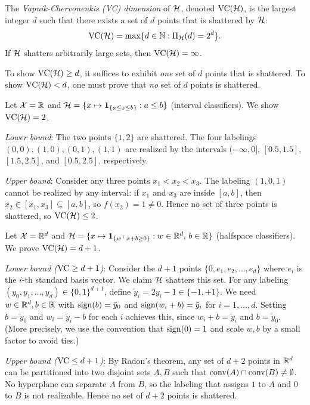 \documentclass[11pt,a4paper]{article}
\begin{document}
\begin{definition}[VC Dimension]
\label{def:vc_dim}
The \emph{Vapnik-Chervonenkis (VC) dimension} of $\mathcal{H}$, denoted
$\operatorname{VC}(\mathcal{H})$, is the largest integer $d$ such that there exists a
set of $d$ points that is shattered by $\mathcal{H}$:
\[
    \operatorname{VC}(\mathcal{H}) = \max\{d \in \mathbb{N} : \Pi_{\mathcal{H}}(d) = 2^d\}.
\]
If $\mathcal{H}$ shatters arbitrarily large sets, then
$\operatorname{VC}(\mathcal{H}) = \infty$.
\end{definition}

\begin{remark}
\label{rem:vc_existence}
To show $\operatorname{VC}(\mathcal{H}) \geq d$, it suffices to exhibit \emph{one}
set of $d$ points that is shattered.  To show $\operatorname{VC}(\mathcal{H}) < d$,
one must prove that \emph{no} set of $d$ points is shattered.
\end{remark}

\begin{example}
\label{ex:vc_intervals}
Let $\mathcal{X} = \mathbb{R}$ and
$\mathcal{H} = \{x \mapsto \mathbf{1}_{\{a \leq x \leq b\}} :
a \leq b\}$ (interval classifiers).  We show $\operatorname{VC}(\mathcal{H}) = 2$.

\emph{Lower bound}: The two points $\{1, 2\}$ are shattered.
The four labelings $(0,0), (1,0), (0,1), (1,1)$ are realized by
the intervals $(-\infty, 0]$, $[0.5, 1.5]$, $[1.5, 2.5]$, and
$[0.5, 2.5]$, respectively.

\emph{Upper bound}: Consider any three points $x_1 < x_2 < x_3$.
The labeling $(1, 0, 1)$ cannot be realized by any interval: if
$x_1$ and $x_3$ are inside $[a, b]$, then $x_2 \in [x_1, x_3]
\subseteq [a, b]$, so $f(x_2) = 1 \neq 0$.  Hence no set of three
points is shattered, so $\operatorname{VC}(\mathcal{H}) \leq 2$.
\end{example}

\begin{example}
\label{ex:vc_halfspaces}
Let $\mathcal{X} = \mathbb{R}^d$ and $\mathcal{H} = \{x \mapsto
\mathbf{1}_{\{w^\top x + b \geq 0\}} : w \in \mathbb{R}^d, \, b \in \mathbb{R}\}$
(halfspace classifiers).  We prove $\operatorname{VC}(\mathcal{H}) = d + 1$.

\emph{Lower bound ($\operatorname{VC} \geq d + 1$)}: Consider the $d + 1$ points
$\{0, e_1, e_2, \ldots, e_d\}$ where $e_i$ is the $i$-th standard
basis vector.  We claim $\mathcal{H}$ shatters this set.  For any
labeling $(y_0, y_1, \ldots, y_d) \in \{0, 1\}^{d+1}$, define
$\tilde{y}_i = 2y_i - 1 \in \{-1, +1\}$.  We need
$w \in \mathbb{R}^d, b \in \mathbb{R}$ with $\operatorname{sign}(b) = \tilde{y}_0$ and
$\operatorname{sign}(w_i + b) = \tilde{y}_i$ for $i = 1, \ldots, d$.  Setting
$b = \tilde{y}_0$ and $w_i = \tilde{y}_i - b$ for each $i$ achieves
this, since $w_i + b = \tilde{y}_i$ and $b = \tilde{y}_0$.  (More
precisely, we use the convention that $\operatorname{sign}(0) = 1$ and scale
$w, b$ by a small factor to avoid ties.)

\emph{Upper bound ($\operatorname{VC} \leq d + 1$)}: By Radon's theorem, any set
of $d + 2$ points in $\mathbb{R}^d$ can be partitioned into two disjoint sets
$A, B$ such that $\operatorname{conv}(A) \cap \operatorname{conv}(B) \neq \emptyset$.  No
hyperplane can separate $A$ from $B$, so the labeling that assigns
$1$ to $A$ and $0$ to $B$ is not realizable.  Hence no set of
$d + 2$ points is shattered.
\end{example}
\end{document}

